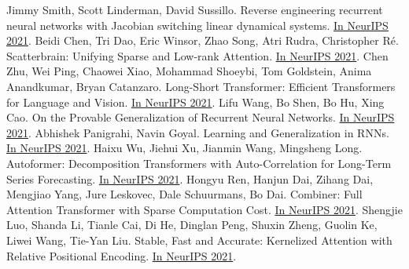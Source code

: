 \documentclass[b5paper,xelatex,ja=standard,10pt]{bxjsarticle}
\begin{document}
\begin{thebibliography}{99}
     Jimmy Smith, Scott Linderman, David Sussillo. Reverse engineering recurrent neural networks with Jacobian switching linear dynamical systems. {\href{https://proceedings.neurips.cc/paper/2021/hash/8b77b4b5156dc11dec152c6c71481565-Abstract.html}{In NeurIPS 2021}}.
     Beidi Chen, Tri Dao, Eric Winsor, Zhao Song, Atri Rudra, Christopher Ré. Scatterbrain: Unifying Sparse and Low-rank Attention. {\href{https://proceedings.neurips.cc/paper/2021/hash/9185f3ec501c674c7c788464a36e7fb3-Abstract.html}{In NeurIPS 2021}}.
     Chen Zhu, Wei Ping, Chaowei Xiao, Mohammad Shoeybi, Tom Goldstein, Anima Anandkumar, Bryan Catanzaro. Long-Short Transformer: Efficient Transformers for Language and Vision. {\href{https://proceedings.neurips.cc/paper/2021/hash/9425be43ba92c2b4454ca7bf602efad8-Abstract.html}{In NeurIPS 2021}}.
     Lifu Wang, Bo Shen, Bo Hu, Xing Cao. On the Provable Generalization of Recurrent Neural Networks. {\href{https://proceedings.neurips.cc/paper/2021/hash/a928731e103dfc64c0027fa84709689e-Abstract.html}{In NeurIPS 2021}}.
     Abhishek Panigrahi, Navin Goyal. Learning and Generalization in RNNs. {\href{https://proceedings.neurips.cc/paper/2021/hash/b04c387c8384ca083a71b8da516f65f6-Abstract.html}{In NeurIPS 2021}}.
     Haixu Wu, Jiehui Xu, Jianmin Wang, Mingsheng Long. Autoformer: Decomposition Transformers with Auto-Correlation for Long-Term Series Forecasting. {\href{https://proceedings.neurips.cc/paper/2021/hash/bcc0d400288793e8bdcd7c19a8ac0c2b-Abstract.html}{In NeurIPS 2021}}.
     Hongyu Ren, Hanjun Dai, Zihang Dai, Mengjiao Yang, Jure Leskovec, Dale Schuurmans, Bo Dai. Combiner: Full Attention Transformer with Sparse Computation Cost. {\href{https://proceedings.neurips.cc/paper/2021/hash/bd4a6d0563e0604510989eb8f9ff71f5-Abstract.html}{In NeurIPS 2021}}.
     Shengjie Luo, Shanda Li, Tianle Cai, Di He, Dinglan Peng, Shuxin Zheng, Guolin Ke, Liwei Wang, Tie-Yan Liu. Stable, Fast and Accurate: Kernelized Attention with Relative Positional Encoding. {\href{https://proceedings.neurips.cc/paper/2021/hash/c0f168ce8900fa56e57789e2a2f2c9d0-Abstract.html}{In NeurIPS 2021}}.
\end{thebibliography}


\end{document}

